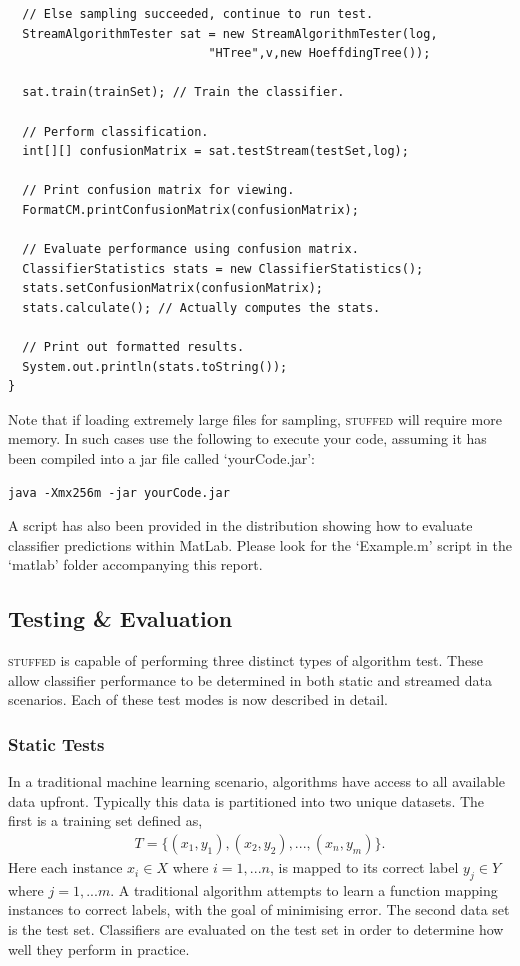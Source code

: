 \documentclass[twoside,a4paper]{refart}
\begin{document}
\begin{lstlisting}
  // Else sampling succeeded, continue to run test.
  StreamAlgorithmTester sat = new StreamAlgorithmTester(log,
                            "HTree",v,new HoeffdingTree());

  sat.train(trainSet); // Train the classifier.

  // Perform classification.		
  int[][] confusionMatrix = sat.testStream(testSet,log);

  // Print confusion matrix for viewing.		
  FormatCM.printConfusionMatrix(confusionMatrix);
		
  // Evaluate performance using confusion matrix.
  ClassifierStatistics stats = new ClassifierStatistics();
  stats.setConfusionMatrix(confusionMatrix);
  stats.calculate(); // Actually computes the stats.

  // Print out formatted results.	
  System.out.println(stats.toString());
}
\end{lstlisting}

Note that if loading extremely large files for sampling, \textsc{stuffed} will require more memory. In such cases use the following to execute your code, assuming it has been compiled into a jar file called `yourCode.jar':

\begin{lstlisting}[caption={Executing a JAR file with more 256 MB of heap memory.}]
java -Xmx256m -jar yourCode.jar
\end{lstlisting}

A script has also been provided in the distribution showing how to evaluate classifier predictions within MatLab. Please look for the `Example.m' script in the `matlab' folder accompanying this report.
\newpage
\subsection{Testing \& Evaluation}
\textsc{stuffed} is capable of performing three distinct types of algorithm test. These allow classifier performance to be determined in both static and streamed data scenarios. Each of these test modes is now described in detail.

\subsubsection{Static Tests}
In a traditional machine learning scenario, algorithms have access to all available data upfront. Typically this data is partitioned into two unique datasets. The first is a training set defined as,
\begin{eqnarray*}
T= \lbrace (x_{1},y_{1}),(x_{2},y_{2}),...,(x_{n},y_{m}) \rbrace \textrm{.}
\end{eqnarray*}
Here each instance $x_{i} \in X$ where $i=1,...n$, is mapped to its correct label $y_{j} \in Y$ where $j=1,...m$. A traditional algorithm attempts to learn a function mapping instances to correct labels, with the goal of minimising error. The second data set is the test set. Classifiers are evaluated on the test set in order to determine how well they perform in practice.
\end{document}
